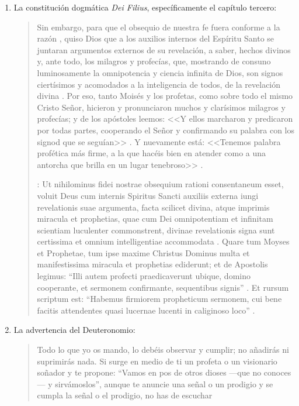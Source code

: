 \begin{enumerate}
\item La constitución dogmática \emph{Dei Filius}, específicamente el capítulo
  tercero: \blockquote[{\cite[\S\,3009]{vati1870df}}: Ut nihilominus fidei
  nostrae obsequium rationi consentaneum  esset,
  voluit Deus cum internis Spiritus Sancti auxiliis externa iungi revelationis
  suae argumenta, facta scilicet divina, atque imprimis miracula et prophetias,
  quae cum Dei omnipotentiam et infinitam scientiam luculenter commonstrent,
  divinae revelationis signa sunt certissima et omnium intelligentiae
  accommodata . Quare tum Moyses et Prophetae, tum
  ipse maxime Christus Dominus multa et manifestissima miracula et prophetias
  ediderunt; et de Apostolis legimus: ``Illi autem profecti praedicaverunt
  ubique, domino cooperante, et sermonem confirmante, sequentibus signis''
  . Et rursum scriptum est: ``Habemus firmiorem
  propheticum sermonem, cui bene facitis attendentes quasi lucernae lucenti in
  caliginoso loco'' .]{Sin embargo, para que el
    obsequio de nuestra fe fuera conforme a la razón , quiso Dios que a los auxilios internos del Espíritu Santo se
    juntaran argumentos externos de su revelación, a saber, hechos divinos y,
    ante todo, los milagros y profecías, que, mostrando de consuno luminosamente
    la omnipotencia y ciencia infinita de Dios, son signos ciertísimos y
    acomodados a la inteligencia de todos, de la revelación divina
    . Por eso, tanto Moisés y los profetas, como
    sobre todo el mismo Cristo Señor, hicieron y pronunciaron muchos y
    clarísimos milagros y profecías; y de los apóstoles leemos: <<Y ellos
    marcharon y predicaron por todas partes, cooperando el Señor y confirmando
    su palabra con los signod que se seguían>> . Y
    nuevamente está: <<Tenemos palabra profética más firme, a la que hacéis bien
    en atender como a una antorcha que brilla en un lugar tenebroso>>
    .}
\item La advertencia del Deuteronomio: \blockquote{Todo lo que yo os mando, lo
    debéis observar y cumplir; no añadirás ni suprimirás nada. Si surge en medio
    de ti un profeta o un visionario soñador y te propone: \enquote{Vamos en pos
      de otros dioses ---que no conoces--- y sirvámoslos}, aunque te anuncie una
    señal o un prodigio y se cumpla la señal o el prodigio, no has de escuchar
}
\end{enumerate}
